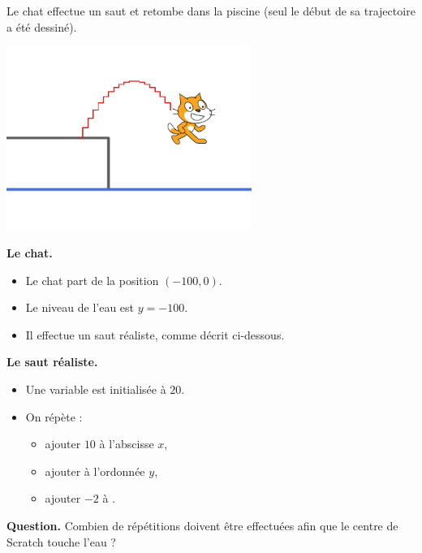 \documentclass[class=report,crop=false, 12pt]{standalone}
\begin{document}
\begin{enigme}

Le chat effectue un saut et retombe dans la piscine (seul le début de sa trajectoire a été dessiné).

\begin{center}
  \includegraphics[width=0.6\textwidth]{ecran-08-eg3} 
\end{center}


\bigskip
\textbf{Le chat.}

\begin{itemize}
  \item Le chat part de la position $(-100,0)$.
  \item Le niveau de l'eau est $y=-100$.
  \item Il effectue un saut réaliste, comme décrit ci-dessous.
\end{itemize}


\bigskip
\textbf{Le saut réaliste.}

\begin{itemize}
  \item Une variable  est initialisée à $20$.
  \item On répète :
  \begin{itemize}
    \item ajouter $10$ à l'abscisse $x$,
    \item ajouter  à l'ordonnée $y$,
    \item ajouter $-2$ à .
  \end{itemize}
\end{itemize}

\bigskip

\textbf{Question.} Combien de répétitions doivent être effectuées afin que le centre de Scratch touche l'eau ?



\end{enigme}
\end{document}
